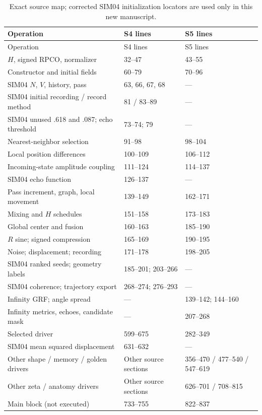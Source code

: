 \documentclass[11pt,a4paper]{article}
\begin{document}
\small
\begin{longtable}{@{}p{76mm}p{29mm}p{29mm}@{}}
\caption{Exact source map; corrected SIM04 initialization locators are used only in this new manuscript.}\label{tab:locators}\\
\toprule Operation & \textsf{S4} lines & \textsf{S5} lines\\\midrule\endfirsthead
\toprule Operation & \textsf{S4} lines & \textsf{S5} lines\\\midrule\endhead
$H$, signed RPCO, normalizer & 32--47 & 43--55\\
Constructor and initial fields & 60--79 & 70--96\\
SIM04 $N$, $V$, history, pass & 63, 66, 67, 68 & ---\\
SIM04 initial recording / record method & 81 / 83--89 & ---\\
SIM04 unused .618 and .087; echo threshold & 73--74; 79 & ---\\
Nearest-neighbor selection & 91--98 & 98--104\\
Local position differences & 100--109 & 106--112\\
Incoming-state amplitude coupling & 111--124 & 114--137\\
SIM04 echo function & 126--137 & ---\\
Pass increment, graph, local movement & 139--149 & 162--171\\
Mixing and $H$ schedules & 151--158 & 173--183\\
Global center and fusion & 160--163 & 185--190\\
$R$ sine; signed compression & 165--169 & 190--195\\
Noise; displacement; recording & 171--178 & 198--205\\
SIM04 ranked seeds; geometry labels & 185--201; 203--266 & ---\\
SIM04 coherence; trajectory export & 268--274; 276--293 & ---\\
Infinity GRF; angle spread & --- & 139--142; 144--160\\
Infinity metrics, echoes, candidate mask & --- & 207--268\\
Selected driver & 599--675 & 282--349\\
SIM04 mean squared displacement & 631--632 & ---\\
Other shape / memory / golden drivers & Other source sections & 356--470 / 477--540 / 547--619\\
Other zeta / anatomy drivers & Other source sections & 626--701 / 708--815\\
Main block (not executed) & 733--755 & 822--837\\
\bottomrule
\end{longtable}
\normalsize
\end{document}
